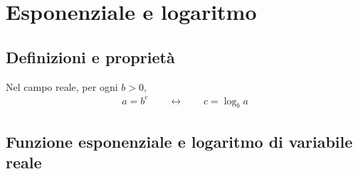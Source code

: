 \documentclass[letterpaper,10pt,italian]{jupyterBook}
\begin{document}
\sphinxstepscope


\chapter{Esponenziale e logaritmo}
\label{\detokenize{ch/exponential_logarithm:esponenziale-e-logaritmo}}\label{\detokenize{ch/exponential_logarithm:math-hs-exp-log}}\label{\detokenize{ch/exponential_logarithm::doc}}

\section{Definizioni e proprietà}
\label{\detokenize{ch/exponential_logarithm:definizioni-e-proprieta}}
\sphinxAtStartPar
Nel campo reale, per ogni \(b > 0\),
\begin{equation*}
\begin{split}a = b^c \qquad \leftrightarrow \qquad c = \log_{b} a \end{split}
\end{equation*}

\section{Funzione esponenziale e logaritmo di variabile reale}
\label{\detokenize{ch/exponential_logarithm:funzione-esponenziale-e-logaritmo-di-variabile-reale}}
\end{document}
